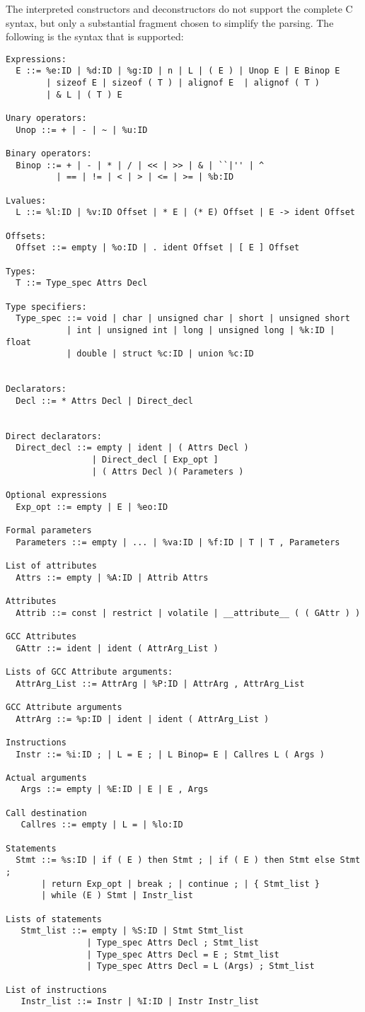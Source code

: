 \documentclass{article}
\begin{document}
 The interpreted constructors and deconstructors do not support the complete C
syntax, but only a substantial fragment chosen to simplify the parsing. The
following is the syntax that is supported:
\begin{verbatim}
Expressions:
  E ::= %e:ID | %d:ID | %g:ID | n | L | ( E ) | Unop E | E Binop E 
        | sizeof E | sizeof ( T ) | alignof E  | alignof ( T ) 
        | & L | ( T ) E 

Unary operators:
  Unop ::= + | - | ~ | %u:ID

Binary operators:
  Binop ::= + | - | * | / | << | >> | & | ``|'' | ^ 
          | == | != | < | > | <= | >= | %b:ID

Lvalues:
  L ::= %l:ID | %v:ID Offset | * E | (* E) Offset | E -> ident Offset 

Offsets:
  Offset ::= empty | %o:ID | . ident Offset | [ E ] Offset

Types:
  T ::= Type_spec Attrs Decl

Type specifiers:
  Type_spec ::= void | char | unsigned char | short | unsigned short
            | int | unsigned int | long | unsigned long | %k:ID | float 
            | double | struct %c:ID | union %c:ID 


Declarators:
  Decl ::= * Attrs Decl | Direct_decl


Direct declarators:
  Direct_decl ::= empty | ident | ( Attrs Decl ) 
                 | Direct_decl [ Exp_opt ]
                 | ( Attrs Decl )( Parameters )

Optional expressions
  Exp_opt ::= empty | E | %eo:ID

Formal parameters
  Parameters ::= empty | ... | %va:ID | %f:ID | T | T , Parameters

List of attributes
  Attrs ::= empty | %A:ID | Attrib Attrs

Attributes
  Attrib ::= const | restrict | volatile | __attribute__ ( ( GAttr ) )

GCC Attributes
  GAttr ::= ident | ident ( AttrArg_List )

Lists of GCC Attribute arguments:
  AttrArg_List ::= AttrArg | %P:ID | AttrArg , AttrArg_List

GCC Attribute arguments  
  AttrArg ::= %p:ID | ident | ident ( AttrArg_List )

Instructions
  Instr ::= %i:ID ; | L = E ; | L Binop= E | Callres L ( Args )

Actual arguments
   Args ::= empty | %E:ID | E | E , Args

Call destination
   Callres ::= empty | L = | %lo:ID

Statements
  Stmt ::= %s:ID | if ( E ) then Stmt ; | if ( E ) then Stmt else Stmt ;
       | return Exp_opt | break ; | continue ; | { Stmt_list } 
       | while (E ) Stmt | Instr_list 

Lists of statements
   Stmt_list ::= empty | %S:ID | Stmt Stmt_list  
                | Type_spec Attrs Decl ; Stmt_list
                | Type_spec Attrs Decl = E ; Stmt_list
                | Type_spec Attrs Decl = L (Args) ; Stmt_list

List of instructions
   Instr_list ::= Instr | %I:ID | Instr Instr_list
\end{verbatim}
\end{document}
